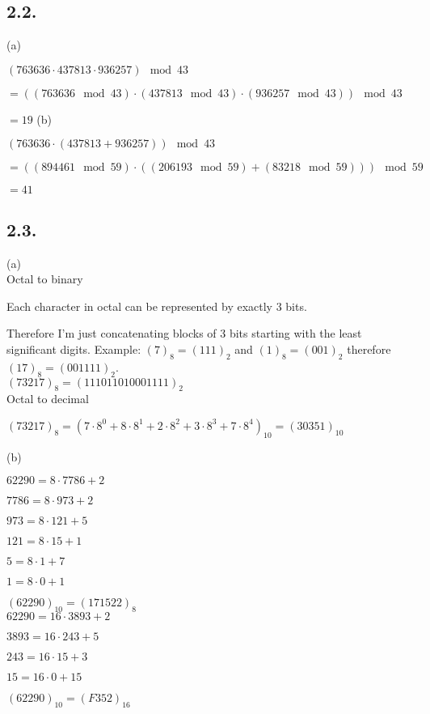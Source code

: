 \documentclass[a4paper,11pt]{article}
\begin{document}
\subsection*{2.2.}
(a)

$(763636 \cdot 437813 \cdot 936257) \mod 43$

$= ((763636 \mod 43) \cdot (437813 \mod 43) \cdot (936257 \mod 43)) \mod 43$

$= 19$
\noindent (b)

$(763636 \cdot (437813 + 936257)) \mod 43$

$= ((894461 \mod 59) \cdot ((206193 \mod 59) + (83218 \mod 59))) \mod 59$

$= 41$

\subsection*{2.3.}

(a)\\
\noindent Octal to binary

Each character in octal can be represented by exactly 3 bits. 

Therefore I'm just concatenating blocks of 3 bits starting with the least significant digits.
Example: 
$(7)_8 = (111)_2$ and $(1)_8 = (001)_2$ therefore  $(17)_8 = (001111)_2$.\\

$(73217)_8 = (111011010001111)_2$\\

\noindent Octal to decimal

$(73217)_8 = (7 \cdot 8^0 + 8 \cdot 8^1 + 2 \cdot 8^2 + 3 \cdot 8^3 + 7 \cdot 8^4)_{10} = (30351)_{10}$

\noindent (b)

$62290 = 8 \cdot 7786 + 2$

$7786 = 8 \cdot 973 + 2$

$973 = 8 \cdot 121 + 5$

$121 = 8 \cdot 15 + 1$

$5 = 8 \cdot 1 + 7$

$1 = 8 \cdot 0 + 1$

$(62290)_{10} = (171522)_8$\\


$62290 = 16 \cdot 3893 + 2$

$3893 = 16 \cdot 243 + 5$

$243 = 16 \cdot 15 + 3$

$15 = 16 \cdot 0 + 15$

$(62290)_{10} = (F352)_{16}$
\end{document}
